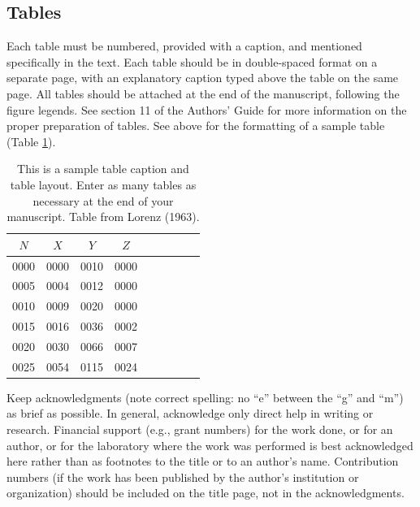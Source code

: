 \documentclass[12pt]{article}
\begin{document}
\subsection{Tables}
Each table must be numbered, provided with a caption, and mentioned specifically in
the text. Each table should be in double-spaced format on a separate page, with an
explanatory caption typed above the table on the same page. All tables should be attached at
the end of the manuscript, following the figure legends. See section
11 of the Authors' Guide for more information on the proper
preparation of tables. See above for the formatting of a sample
table (Table \ref{t1}).
\begin{table}[t]
\caption{This is a sample table caption and table layout.  Enter as many tables as
  necessary at the end of your manuscript. Table from Lorenz (1963).}\label{t1}
\begin{center}
\begin{tabular}{ccccrrcrc}
\hline\hline
$N$ & $X$ & $Y$ & $Z$\\
\hline
 0000 & 0000 & 0010 & 0000 \\
 0005 & 0004 & 0012 & 0000 \\
 0010 & 0009 & 0020 & 0000 \\
 0015 & 0016 & 0036 & 0002 \\
 0020 & 0030 & 0066 & 0007 \\
 0025 & 0054 & 0115 & 0024 \\
\hline
\end{tabular}
\end{center}
\end{table}
%

\begin{acknowledgment}
 Keep acknowledgments (note correct spelling: no ``e'' between the ``g'' and ``m'') as brief as possible. In general, acknowledge only direct help
in writing or research. Financial support (e.g., grant numbers) for the work done, or for an
author, or for the laboratory where the work was performed is best acknowledged here rather
than as footnotes to the title or to an author's name. Contribution numbers (if the work has
been published by the author's institution or organization) should be included on the title
page, not in the acknowledgments.
\end{acknowledgment}
\end{document}

